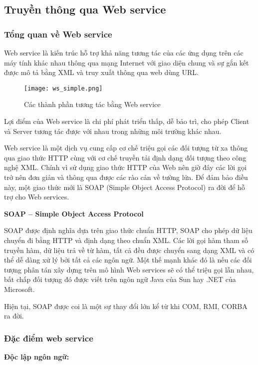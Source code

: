 \subsection{Truyền thông qua Web service}
\subsubsection{Tổng quan về Web service}

Web service là kiến trúc hỗ trợ khả năng tương tác của các ứng dụng trên các máy tính khác nhau thông qua mạng Internet với giao diện chung và sự gắn kết được mô tả bằng XML và truy xuất thông qua web dùng URL.

\begin{figure}[!htb] 
\centering
\texttt{[image: ws\_simple.png]}
\caption{Các thành phần tương tác bằng Web service}
\end{figure}
\newpage

Lợi điểm của Web service là chi phí phát triển thấp, dễ bảo trì, cho phép Client và Server tương tác được với nhau trong những môi trường khác nhau.

Web service là một dịch vụ cung cấp cơ chế triệu gọi các đối tượng từ xa thông qua giao thức HTTP cùng với cơ chế truyền tải định dạng đối tượng theo công nghệ XML. Chính vì sử dụng giao thức HTTP của Web nên giờ đây các lời gọi trở nên đơn giản và thông qua được các rào cản về tường lửa. Để đảm bảo điều này, một giao thức mới là SOAP (Simple Object Access Protocol) ra đời để hỗ trợ cho Web services.  

\textbf{SOAP – Simple Object Access Protocol}

SOAP được định nghĩa dựa trên giao thức chuẩn HTTP, SOAP cho phép dữ liệu chuyển đi bằng HTTP và định dạng theo chuẩn XML. Các lời gọi hàm tham số truyền hàm, dữ liệu trả về từ hàm, tất cả đều được chuyển sang dạng XML và có thể dễ dàng xử lý bởi tất cả các ngôn ngữ. Một thế mạnh khác đó là nếu các đối tượng phân tán xây dựng trên mô hình Web services sẽ có thể triệu gọi lẫn nhau, bất chấp đối tượng đó được viết trên ngôn ngữ Java của Sun hay .NET của Microsoft.
  
Hiện tại, SOAP được coi là một sự thay đổi lớn kể từ khi COM, RMI, CORBA ra đời.

\subsubsection{Đặc điểm web service}

\textbf{Độc lập ngôn ngữ:}

